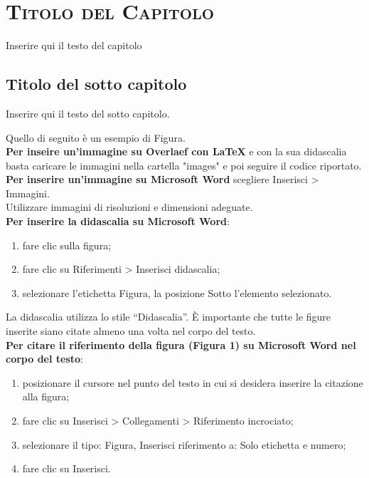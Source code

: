 \chapter{\scshape Titolo del Capitolo}

Inserire qui il testo del capitolo

\section{Titolo del sotto capitolo}
Inserire qui il testo del sotto capitolo.

Quello di seguito è un esempio di Figura.  \\

\noindent \textbf{Per inseire un'immagine su Overlaef con LaTeX} e con la sua didascalia basta caricare le immagini nella cartella "images" e poi seguire il codice riportato. \\

\noindent \textbf{Per inserire un’immagine su Microsoft Word} scegliere Inserisci > Immagini. \\

Utilizzare immagini di risoluzioni e dimensioni adeguate. \\

\noindent \textbf{Per inserire la didascalia su Microsoft Word}: 
\begin{enumerate}
    \item fare clic sulla figura; 
    \item fare clic su Riferimenti > Inserisci didascalia; 
    \item selezionare l’etichetta Figura, la posizione Sotto l’elemento selezionato.
\end{enumerate} 

La didascalia utilizza lo stile “Didascalia”. È importante che tutte le figure inserite siano citate almeno una volta nel corpo del testo. \\

\noindent \textbf{Per citare il riferimento della figura (Figura 1) su Microsoft Word nel corpo del testo}: 
\begin{enumerate}
    \item posizionare il cursore nel punto del testo in cui si desidera inserire la citazione alla figura; 
    \item fare clic su Inserisci > Collegamenti > Riferimento incrociato;
    \item selezionare il tipo: Figura, Inserisci riferimento a: Solo etichetta e numero;
    \item fare clic su Inserisci. 
\end{enumerate} 

